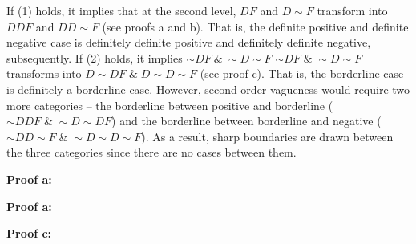 If (1) holds, it implies that at the second level, $DF$ and
$D{\sim}F$ transform into $DDF$ and $DD{\sim}F$ (see proofs a and
b). That is, the definite positive and definite negative case is
definitely definite positive and definitely definite negative,
subsequently. If (2) holds, it implies \(\sim DF\ \&\ \sim D\sim F\)
${\sim}DF \; \& \; {\sim}D{\sim}F$ transforms into $D{\sim}DF \; \& \; D{\sim}D{\sim}F$ (see proof c). That is,
the borderline case is definitely a borderline case. However,
second-order vagueness would require two more categories -- the
borderline between positive and borderline
(${\sim}DDF \; \& \; {\sim}D{\sim}DF$) and the borderline between borderline
and negative (${\sim}DD\sim F \; \& \; {\sim}D{\sim}D{\sim}F$). As a result,
sharp boundaries are drawn between the three categories since there are
no cases between them.


\bigskip
\noindent
\begin{minipage}[t]{0.48\textwidth}
  \noindent \textbf{Proof a:} \\
  \begin{center}
    \end{center}
\end{minipage}
\begin{minipage}[t]{0.48\textwidth}
  \noindent \textbf{Proof a:} \\
  \begin{center}
    \end{center}
  \end{minipage}
\bigskip

\noindent \textbf{Proof c:}
\begin{center}
  \end{center}


  
